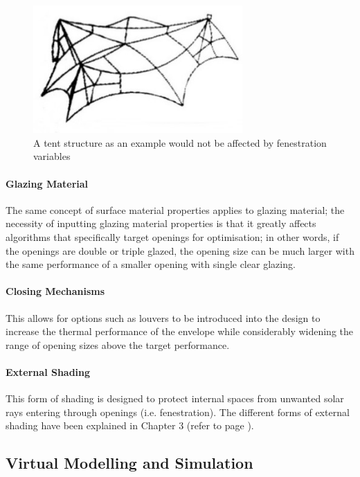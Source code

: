 \begin{figure}[h]
	\centering
	\includegraphics[width=8cm]{./Images/8-Tent}
	\caption[Tent Structure]{A tent structure as an example would not be affected by fenestration variables}
	\label{fig:tent}
\end{figure}
\paragraph{Glazing Material}\mbox{}

The same concept of surface material properties applies to glazing material; the necessity of inputting glazing material properties is that it greatly affects algorithms that specifically target openings for optimisation; in other words, if the openings are double or triple glazed, the opening size can be much larger with the same performance of a smaller opening with single clear glazing.

\paragraph{Closing Mechanisms}\mbox{}

This allows for options such as louvers to be introduced into the design to increase the thermal performance of the envelope while considerably widening the range of opening sizes above the target performance.

\paragraph{External Shading}\mbox{}

This form of shading is designed to protect internal spaces from unwanted solar rays entering through openings (i.e. fenestration). The different forms of external shading have been explained in Chapter 3 (refer to page \pageref{Shading}).

\clearpage
\subsection{Virtual Modelling and Simulation}
\label{sec:SimulationModel}

